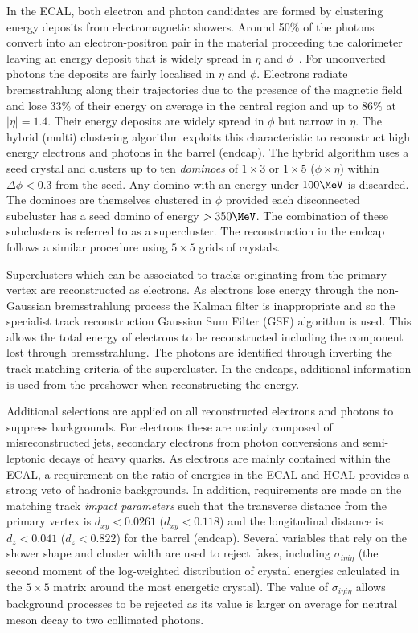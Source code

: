 In the ECAL, both electron and photon candidates are formed by clustering energy deposits
from electromagnetic showers. Around 50\% of the photons convert into an electron-positron 
pair in the material proceeding the calorimeter leaving an energy deposit that is widely 
spread in $\eta$ and $\phi$~\cite{electron_photon_reco}.  For unconverted photons the 
deposits are fairly localised in $\eta$ and $\phi$. Electrons radiate
bremsstrahlung along their trajectories due to the presence of the magnetic field and 
lose $33\%$ of their energy on average in the central region 
and up to $86\%$ at $|\eta| = 1.4$. Their energy deposits are widely spread in $\phi$ but narrow in $\eta$. 
The hybrid (multi) clustering algorithm exploits this characteristic to
reconstruct high energy electrons and photons in the barrel (endcap). The hybrid algorithm
uses a seed crystal and clusters up to ten \emph{dominoes} of $1\times3$ or $1\times5$ ($\phi\times\eta$) within 
$\Delta\phi < 0.3$ from the seed. Any domino with an energy under $100\MeV$ is discarded. The dominoes
are themselves clustered in $\phi$ provided each disconnected subcluster has a seed 
domino of energy $>350\MeV$. The combination of these subclusters is referred 
to as a supercluster. The reconstruction in the endcap follows a similar procedure 
using $5\times5$ grids of crystals. 

Superclusters which can be associated to tracks originating from the primary vertex are reconstructed as electrons.
As electrons lose energy through the non-Gaussian bremsstrahlung process the Kalman filter is inappropriate and
so the specialist track reconstruction Gaussian Sum Filter (GSF) algorithm is used. This allows the total energy of
electrons to be reconstructed including the component lost through bremsstrahlung. The photons are identified 
through inverting the track matching criteria of the supercluster. In the endcaps, additional information
is used from the preshower when reconstructing the energy.

Additional selections are applied on all reconstructed electrons and photons to suppress backgrounds.
For electrons these are mainly composed of misreconstructed jets, secondary electrons from photon
conversions and semi-leptonic decays of heavy quarks. As electrons are mainly contained within 
the ECAL, a requirement on the ratio of energies in the ECAL and HCAL provides a strong veto of hadronic
backgrounds. In addition, requirements are made on the matching track \emph{impact
parameters} such that the transverse distance from the primary vertex is $d_{xy} < 0.0261$ ($d_{xy} < 0.118$) 
and the longitudinal distance is $d_z < 0.041$ ($d_z < 0.822$) for the barrel (endcap). 
Several variables that rely on the shower shape and cluster width are used to
reject fakes, including $\sigma_{i\eta i\eta}$ (the second moment of the log-weighted
distribution of crystal energies calculated in the $5\times5$ matrix around the
most energetic crystal). The value of $\sigma_{i\eta i\eta}$ allows background
processes to be rejected as its value is larger on average for neutral meson decay to two collimated photons.

